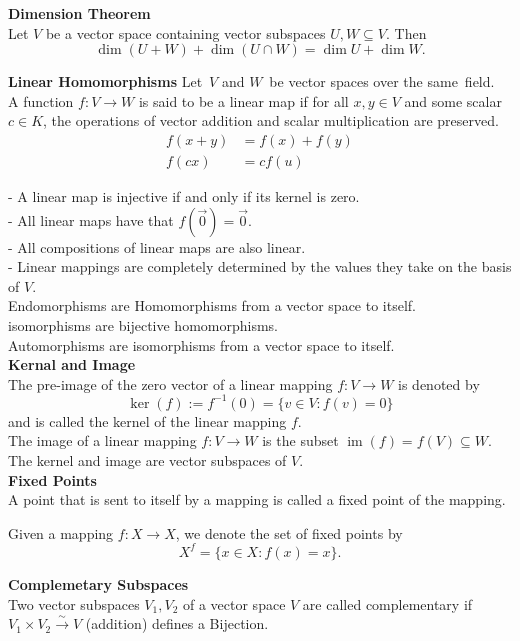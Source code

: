 \documentclass[a4paper, 10pt]{article}
\begin{document}
\begin{multicols*}{3}
\textbf{Dimension Theorem}\\
Let $V$ be a vector space containing vector subspaces $U, W \subseteq V$. Then
$$
\operatorname{dim}(U+W)+\operatorname{dim}(U \cap W)=\operatorname{dim} U+\operatorname{dim} W .
$$

\textbf{Linear Homomorphisms}
Let $V$ and $W$ be vector spaces over the same field. \\
A function $f:V\rightarrow W$ is said to be a linear map if for all $x,y\in V$ and some scalar $c\in K$, the operations of vector addition and scalar multiplication are preserved. 
\begin{align*}
f(x+y) &= f(x)+f(y)\\
f(cx) &= cf(u)
\end{align*}

- A linear map is injective if and only if its kernel is zero. \\
- All linear maps have that $f(\vec{0})=\vec{0}$.\\
- All compositions of linear maps are also linear.\\
- Linear mappings are completely determined by the values they take on the basis of $V$. \\
Endomorphisms are Homomorphisms from a vector space to itself.\\
isomorphisms are bijective homomorphisms.\\
Automorphisms are isomorphisms from a vector space to itself.\\

\textbf{Kernal and Image}\\
The pre-image of the zero vector of a linear mapping $f: V \rightarrow W$ is denoted by
$$
\operatorname{ker}(f):=f^{-1}(0)=\{v \in V: f(v)=0\}
$$
and is called the kernel of the linear mapping $f$. \\
The image of a linear mapping $f: V \rightarrow W$ is the subset $\operatorname{im}(f)=f(V) \subseteq W$. 
The kernel and image are vector subspaces of $V$.\\

\textbf{Fixed Points}\\
A point that is sent to itself by a mapping is called a fixed point of the mapping. 

Given a mapping $f: X \rightarrow X$, we denote the set of fixed points by
$$
X^f=\{x \in X: f(x)=x\} .
$$

\textbf{Complemetary Subspaces}\\
Two vector subspaces $V_1, V_2$ of a vector space $V$ are called complementary if $V_1 \times V_2 \stackrel{\sim}{\rightarrow} V$ (addition) defines a Bijection.


\end{multicols*}
\end{document}

